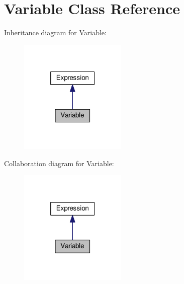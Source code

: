 \hypertarget{classVariable}{}\section{Variable Class Reference}
\label{classVariable}


Inheritance diagram for Variable\+:\nopagebreak
\begin{figure}[H]
\begin{center}
\leavevmode
\includegraphics[width=145pt]{classVariable__inherit__graph}
\end{center}
\end{figure}


Collaboration diagram for Variable\+:\nopagebreak
\begin{figure}[H]
\begin{center}
\leavevmode
\includegraphics[width=145pt]{classVariable__coll__graph}
\end{center}
\end{figure}
